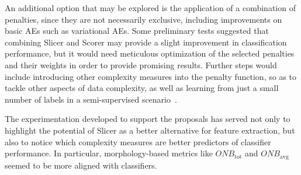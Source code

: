 \documentclass[
	fontsize=11pt, %
	twoside=false, %
	open=any, %
	secnumdepth=1, %
]{kaobook}
\newcommand{\change}[1]{{\color{blue}#1}}
\renewcommand{\change}[1]{#1}
\begin{document}
An additional option that may be explored is the application of a combination of penalties, since they are not necessarily exclusive, \change{including improvements on basic AEs such as variational AEs}. Some preliminary tests suggested that combining Slicer and Scorer may provide a slight improvement in classification performance, but it would need meticulous optimization of the selected penalties and their weights in order to provide promising results. \change{Further steps would include} introducing other complexity measures into the penalty function, so as to tackle other aspects of data complexity\change{, as well as learning from just a small number of labels in a semi-supervised scenario~\cite{kingma2014semi}}.

The experimentation developed to support the proposals has served not only to highlight the potential of Slicer as a better alternative for feature extraction, but also to notice which complexity measures are better predictors of classifier performance. In particular, morphology-based metrics like $\textit{ONB}_{\text{tot}}$ and $\textit{ONB}_{\text{avg}}$ seemed to be more aligned with classifiers.











\end{document}
